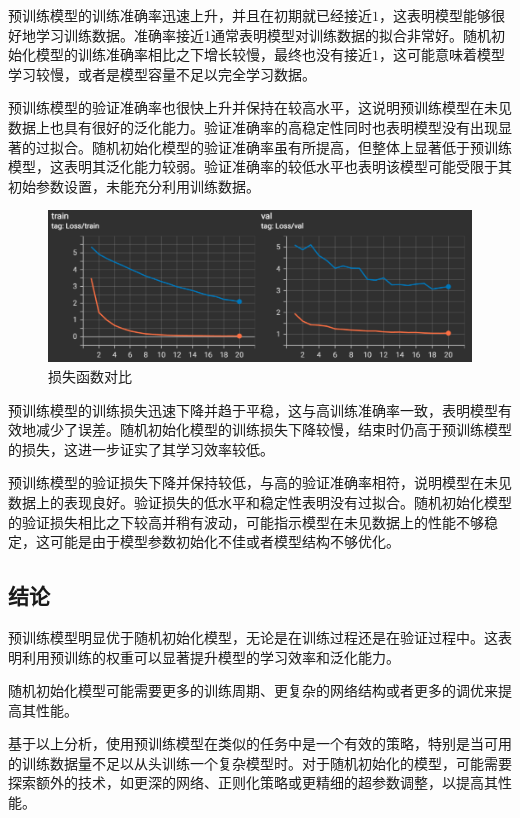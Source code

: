 \documentclass[notitlepage,cs4size,punct,oneside]{ctexrep}
\numberwithin{equation}{chapter}
\theoremstyle{mystyle}
\begin{document}
预训练模型的训练准确率迅速上升，并且在初期就已经接近$1$，这表明模型能够很好地学习训练数据。准确率接近1通常表明模型对训练数据的拟合非常好。随机初始化模型的训练准确率相比之下增长较慢，最终也没有接近$1$，这可能意味着模型学习较慢，或者是模型容量不足以完全学习数据。

预训练模型的验证准确率也很快上升并保持在较高水平，这说明预训练模型在未见数据上也具有很好的泛化能力。验证准确率的高稳定性同时也表明模型没有出现显著的过拟合。随机初始化模型的验证准确率虽有所提高，但整体上显著低于预训练模型，这表明其泛化能力较弱。验证准确率的较低水平也表明该模型可能受限于其初始参数设置，未能充分利用训练数据。


\begin{figure}[H]
    \centering
    \includegraphics[scale=0.75]{loss.png}
    \caption{损失函数对比}
    \label{fig:loss}
\end{figure}

预训练模型的训练损失迅速下降并趋于平稳，这与高训练准确率一致，表明模型有效地减少了误差。随机初始化模型的训练损失下降较慢，结束时仍高于预训练模型的损失，这进一步证实了其学习效率较低。

预训练模型的验证损失下降并保持较低，与高的验证准确率相符，说明模型在未见数据上的表现良好。验证损失的低水平和稳定性表明没有过拟合。随机初始化模型的验证损失相比之下较高并稍有波动，可能指示模型在未见数据上的性能不够稳定，这可能是由于模型参数初始化不佳或者模型结构不够优化。

\subsection{结论}
预训练模型明显优于随机初始化模型，无论是在训练过程还是在验证过程中。这表明利用预训练的权重可以显著提升模型的学习效率和泛化能力。

随机初始化模型可能需要更多的训练周期、更复杂的网络结构或者更多的调优来提高其性能。

基于以上分析，使用预训练模型在类似的任务中是一个有效的策略，特别是当可用的训练数据量不足以从头训练一个复杂模型时。对于随机初始化的模型，可能需要探索额外的技术，如更深的网络、正则化策略或更精细的超参数调整，以提高其性能。
\end{document}

